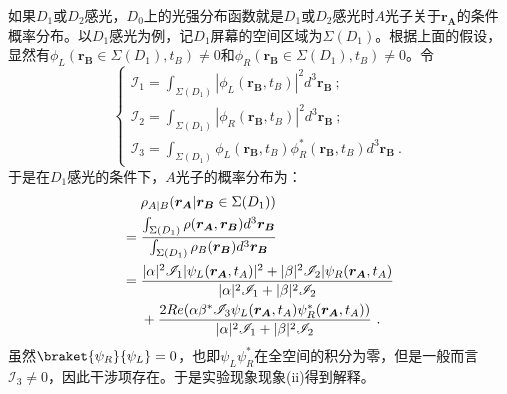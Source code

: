 如果$D_1$或$D_2$感光，$D_0$上的光强分布函数就是$D_1$或$D_2$感光时$A$光子关于$\boldsymbol{r_A}$的条件概率分布。以$D_1$感光为例，记$D_1$屏幕的空间区域为$\Sigma(D_1)$。根据上面的假设，显然有$\phi_L(\boldsymbol{r_B}\in\Sigma(D_1),t_B)\neq 0$和$\phi_R(\boldsymbol{r_B}\in\Sigma(D_1),t_B)\neq 0$。令
\begin{equation}
	\begin{cases}
	\mathscr{I}_1=\int_{\Sigma(D_1)}|\phi_L(\boldsymbol{r_B},t_B)|^2d^3\boldsymbol{r_B}~; \\
	\mathscr{I}_2=\int_{\Sigma(D_1)}|\phi_R(\boldsymbol{r_B},t_B)|^2d^3\boldsymbol{r_B}~; \\
	\mathscr{I}_3=\int_{\Sigma(D_1)}\phi_L(\boldsymbol{r_B},t_B)\phi_R^*(\boldsymbol{r_B},t_B)d^3\boldsymbol{r_B}~.
	\end{cases}
\end{equation}
于是在$D_1$感光的条件下，$A$光子的概率分布为：
\begin{align}
&\rho_{A|B}(\boldsymbol{r_A}|\boldsymbol{r_B}\in\Sigma(D_1)) \notag \\
={}&\frac{\int_{\Sigma(D_1)}\rho(\boldsymbol{r_A},\boldsymbol{r_B})d^3\boldsymbol{r_B}}{\int_{\Sigma(D_1)}\rho_B(\boldsymbol{r_B})d^3\boldsymbol{r_B}} \notag \\
={}&\frac{|\alpha|^2\mathscr{I}_1|\psi_L(\boldsymbol{r_A},t_A)|^2+|\beta|^2\mathscr{I}_2|\psi_R(\boldsymbol{r_A},t_A)}{|\alpha|^2\mathscr{I}_1+|\beta|^2\mathscr{I}_2} \notag \\
&+\frac{2Re(\alpha\beta^*\mathscr{I}_3\psi_L(\boldsymbol{r_A},t_A)\psi_R^*(\boldsymbol{r_A},t_A))}{|\alpha|^2\mathscr{I}_1+|\beta|^2\mathscr{I}_2}~.
\end{align}
虽然$\braket{\psi_R}{\psi_L}=0$，也即$\psi_L\psi_R^*$在全空间的积分为零，但是一般而言$\mathscr{I}_3\neq 0$，因此干涉项存在。于是实验现象现象(ii)得到解释。
